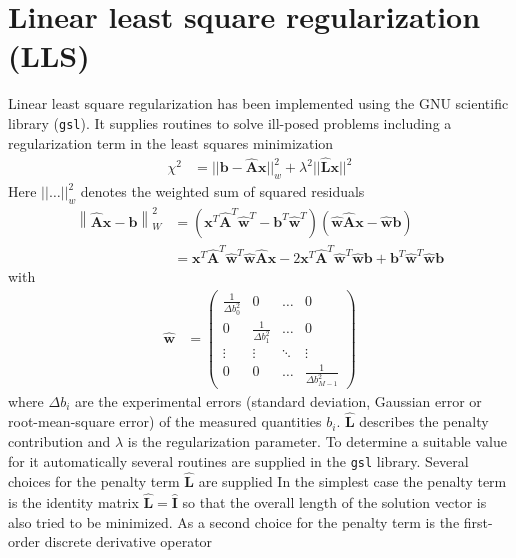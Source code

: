 \section{Linear least square regularization (LLS)}
\label{sec:LLS}
Linear least square regularization has been implemented using the GNU scientific library (\texttt{gsl}). It supplies routines to solve ill-posed problems including a regularization term in the least squares minimization
\begin{align}\label{eq:LLSreg}
  \chi^2 &= || \mathbf{b} - \hat{\mathbf{A}}\mathbf{x} ||_{w}^2 + \lambda^2 || \hat{\mathbf{L}} \mathbf{x} ||^2
\end{align}
Here $|| \dots ||_{w}^2$ denotes the weighted sum of squared residuals
\begin{align}\label{eq:wSumSR}
\left\| \hat{\mathbf{A}}\mathbf{x}-\mathbf{b}\right\|_W^2
&= \left(\mathbf{x}^T\hat{\mathbf{A}}^T\hat{\mathbf{w}}^T-\mathbf{b}^T\hat{\mathbf{w}}^T\right)\left(\hat{\mathbf{w}}\hat{\mathbf{A}}\mathbf{x}-\hat{\mathbf{w}}\mathbf{b}\right)\\
&= \mathbf{x}^T\hat{\mathbf{A}}^T\hat{\mathbf{w}}^T\hat{\mathbf{w}}\hat{\mathbf{A}}\mathbf{x}-2 \mathbf{x}^T\hat{\mathbf{A}}^T\hat{\mathbf{w}}^T\hat{\mathbf{w}}\mathbf{b}+\mathbf{b}^T\hat{\mathbf{w}}^T\hat{\mathbf{w}}\mathbf{b}
\end{align}
with
\begin{align}
  \hat{\mathbf{w}} &=
  \begin{pmatrix}
    \frac{1}{\Delta b_0^2} & 0 & \dots & 0 \\
    0 & \frac{1}{\Delta b_1^2} & \dots & 0 \\
    \vdots & \vdots & \ddots & \vdots \\
    0 & 0 & \dots & \frac{1}{\Delta b_{M-1}^2}
  \end{pmatrix}
\end{align}
where $\Delta b_i$ are the experimental errors (standard deviation, Gaussian error or root-mean-square error) of the measured quantities $b_i$.
$\hat{\mathbf{L}}$ describes the penalty contribution and $\lambda$
 is the regularization parameter. To determine a suitable value for it automatically several routines are supplied in the \texttt{gsl} library. Several choices for the penalty term $\hat{\mathbf{L}}$ are supplied
 In the simplest case the penalty term is the identity matrix $\hat{\mathbf{L}} = \hat{\mathbf{I}}$ so that the overall length of the solution vector is also tried to be minimized. As a second choice for the penalty term is the first-order discrete derivative operator \cite{Donatelli2014}
